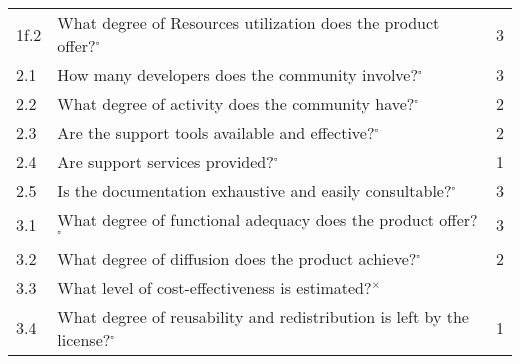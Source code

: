 \begin{longtable}[]{|p{1cm}p{10cm}p{2cm}|}
1f.2 & What degree of Resources utilization does the product offer?$^{\square}$ & 3 \\
2.1 & How many developers does the community involve?$^{\square}$ & 3 \\
2.2 & What degree of activity does the community have?$^{\square}$ & 2 \\
2.3 & Are the support tools available and effective?$^{\square}$ & 2 \\
2.4 & Are support services provided?$^{\square}$ & 1 \\
2.5 & Is the documentation exhaustive and easily consultable?$^{\square}$ & 3 \\
3.1 & What degree of functional adequacy does the product offer?$^{\square}$ & 3 \\
3.2 & What degree of diffusion does the product achieve?$^{\square}$ & 2 \\
3.3 & What level of cost-effectiveness is estimated?$^{\times}$ & \\
3.4 & What degree of reusability and redistribution is left by the
license?$^{\square}$ & 1 \\
\bottomrule
\end{longtable}

